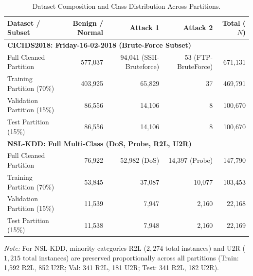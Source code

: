 \documentclass[journal]{IEEEtran}
\begin{document}
\begin{table}[!t]
\centering
\caption{Dataset Composition and Class Distribution Across Partitions.}
\label{tab:dataset}
\scriptsize
\setlength{\tabcolsep}{4pt}
\renewcommand{\arraystretch}{1.15}
\begin{tabularx}{\textwidth}{X r r r r}
\toprule
\textbf{Dataset / Subset} & \textbf{Benign / Normal} & \textbf{Attack 1} & \textbf{Attack 2} & \textbf{Total ($N$)} \\
\midrule
\multicolumn{5}{l}{\textbf{CICIDS2018: Friday-16-02-2018 (Brute-Force Subset)}} \\
Full Cleaned Partition & 577,037 & 94,041 (SSH-Bruteforce) & 53 (FTP-BruteForce) & 671,131 \\
\quad Training Partition (70\%) & 403,925 & 65,829 & 37 & 469,791 \\
\quad Validation Partition (15\%) & 86,556 & 14,106 & 8 & 100,670 \\
\quad Test Partition (15\%) & 86,556 & 14,106 & 8 & 100,670 \\
\midrule
\multicolumn{5}{l}{\textbf{NSL-KDD: Full Multi-Class (DoS, Probe, R2L, U2R)}} \\
Full Cleaned Partition & 76,922 & 52,982 (DoS) & 14,397 (Probe) & 147,790 \\
\quad Training Partition (70\%) & 53,845 & 37,087 & 10,077 & 103,453 \\
\quad Validation Partition (15\%) & 11,539 & 7,947 & 2,160 & 22,168 \\
\quad Test Partition (15\%) & 11,538 & 7,948 & 2,160 & 22,169 \\
\bottomrule
\end{tabularx}
\vspace{1mm}
\begin{minipage}{\textwidth}
\tiny
\textit{Note:} For NSL-KDD, minority categories R2L ($2{,}274$ total instances) and U2R ($1{,}215$ total instances) are preserved proportionally across all partitions (Train: 1,592 R2L, 852 U2R; Val: 341 R2L, 181 U2R; Test: 341 R2L, 182 U2R).
\end{minipage}
\end{table}
\end{document}
